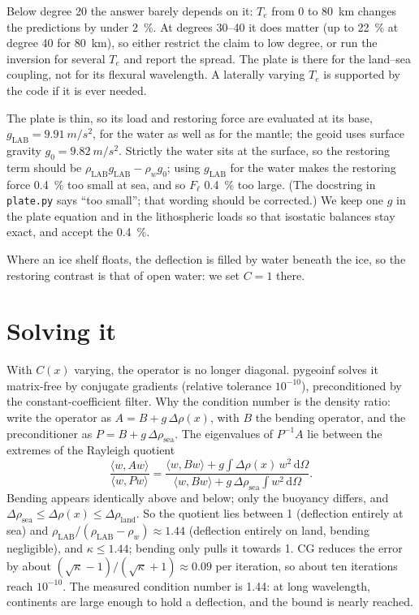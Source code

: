 \begin{defence}
\A Below degree 20 the answer barely depends on it: $T_e$ from 0 to \qty{80}{km} changes the predictions by under \qty{2}{\percent}.
At degrees 30--40 it does matter (up to \qty{22}{\percent} at degree 40 for \qty{80}{km}), so either restrict the claim to low degree, or run the inversion for several $T_e$ and report the spread.
The plate is there for the land--sea coupling, not for its flexural wavelength.
A laterally varying $T_e$ is supported by the code if it is ever needed.

\A The plate is thin, so its load and restoring force are evaluated at its base, $g_{\mathrm{LAB}} = \qty{9.91}{m/s^2}$, for the water as well as for the mantle; the geoid uses surface gravity $g_0 = \qty{9.82}{m/s^2}$.
Strictly the water sits at the surface, so the restoring term should be $\rho_{\mathrm{LAB}}g_{\mathrm{LAB}}-\rho_w g_0$; using $g_{\mathrm{LAB}}$ for the water makes the restoring force \qty{0.4}{\percent} too small at sea, and so $F_\ell$ \qty{0.4}{\percent} too large. (The docstring in \texttt{plate.py} says ``too small''; that wording should be corrected.)
We keep one $g$ in the plate equation and in the lithospheric loads so that isostatic balances stay exact, and accept the \qty{0.4}{\percent}.

\A Where an ice shelf floats, the deflection is filled by water beneath the ice, so the restoring contrast is that of open water: we set $C=1$ there.
\end{defence}

\section{Solving it}

With $C(x)$ varying, the operator is no longer diagonal.
pygeoinf solves it matrix-free by conjugate gradients (relative tolerance $10^{-10}$), preconditioned by the constant-coefficient filter.
Why the condition number is the density ratio: write the operator as $A = B + g\,\Delta\rho(x)$, with $B$ the bending operator, and the preconditioner as $P = B + g\,\Delta\rho_{\mathrm{sea}}$.
The eigenvalues of $P^{-1}A$ lie between the extremes of the Rayleigh quotient
\[
    \frac{\langle w, Aw\rangle}{\langle w, Pw\rangle}
    = \frac{\langle w, Bw\rangle + g\int \Delta\rho(x)\,w^2\,\mathrm d\Omega}{\langle w, Bw\rangle + g\,\Delta\rho_{\mathrm{sea}}\int w^2\,\mathrm d\Omega}.
\]
Bending appears identically above and below; only the buoyancy differs, and $\Delta\rho_{\mathrm{sea}}\le\Delta\rho(x)\le\Delta\rho_{\mathrm{land}}$.
So the quotient lies between 1 (deflection entirely at sea) and $\rho_{\mathrm{LAB}}/(\rho_{\mathrm{LAB}}-\rho_w)\approx1.44$ (deflection entirely on land, bending negligible), and $\kappa\le1.44$; bending only pulls it towards 1.
CG reduces the error by about $(\sqrt\kappa-1)/(\sqrt\kappa+1)\approx0.09$ per iteration, so about ten iterations reach $10^{-10}$.
The measured condition number is 1.44: at long wavelength, continents are large enough to hold a deflection, and the bound is nearly reached.

